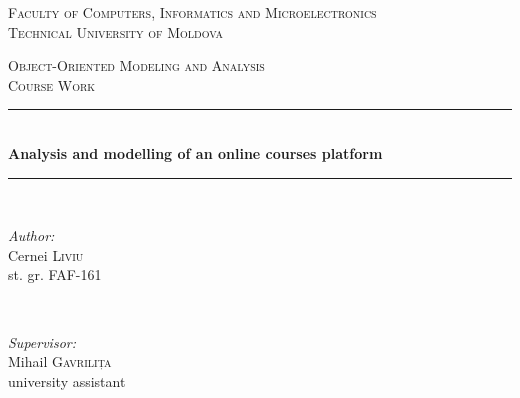 \documentclass[12pt,a4paper,titlepage]{article}
\begin{document}
\begin{titlepage}

  \begin{center} %

  \textsc{\large Faculty of Computers, Informatics and Microelectronics}\\[0.5cm]
  \textsc{\large Technical University of Moldova}\\[1.2cm] %
  \vspace{25 mm}

  \textsc{\Large Object-Oriented Modeling and Analysis}\\[0.5cm] %
  \textsc{\large Course Work}\\[0.5cm] %

\newcommand{\HRule}{\rule{\linewidth}{0.5mm}} %

  \vspace{10 mm}
  \HRule \\[0.4cm]
  { \LARGE \bfseries Analysis and modelling of an online courses platform }\\[0.4cm] %
  \HRule \\[1.5cm]

      \vspace{30mm}

      \begin{minipage}{0.4\textwidth}
      \begin{flushleft} \large
      \emph{Author:}\\
      Cernei \textsc{Liviu}\\
      st. gr. FAF-161
      \end{flushleft}
      \end{minipage}
      ~
      \begin{minipage}{0.4\textwidth}
      \begin{flushright} \large
      \emph{Supervisor:} \\
      Mihail \textsc{Gavrilița}\\ %
      university assistant
      \end{flushright}
      \end{minipage}\\[4cm]


\end{center}
\end{titlepage}
\end{document}
